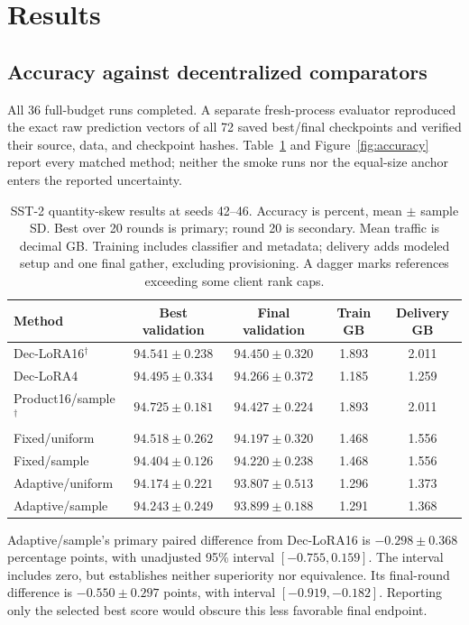 \documentclass[11pt]{article}
\begin{document}
\section{Results}
\subsection{Accuracy against decentralized comparators}
All 36 full-budget runs completed. A separate fresh-process evaluator reproduced the exact raw prediction vectors of all 72 saved best/final checkpoints and verified their source, data, and checkpoint hashes. Table~\ref{tab:results} and Figure~\ref{fig:accuracy} report every matched method; neither the smoke runs nor the equal-size anchor enters the reported uncertainty.
\begin{table}[t]
\centering\small
\caption{SST-2 quantity-skew results at seeds 42--46. Accuracy is percent, mean $\pm$ sample SD. Best over 20 rounds is primary; round 20 is secondary. Mean traffic is decimal GB. Training includes classifier and metadata; delivery adds modeled setup and one final gather, excluding provisioning. A dagger marks references exceeding some client rank caps.}
\label{tab:results}
\setlength{\tabcolsep}{4pt}
\begin{tabular}{lcccc}
\toprule
Method & Best validation & Final validation & Train GB & Delivery GB\\
\midrule
Dec-LoRA16$^\dagger$ & $94.541\pm0.238$ & $94.450\pm0.320$ & 1.893 & 2.011\\
Dec-LoRA4 & $94.495\pm0.334$ & $94.266\pm0.372$ & 1.185 & 1.259\\
Product16/sample$^\dagger$ & $94.725\pm0.181$ & $94.427\pm0.224$ & 1.893 & 2.011\\
Fixed/uniform & $94.518\pm0.262$ & $94.197\pm0.320$ & 1.468 & 1.556\\
Fixed/sample & $94.404\pm0.126$ & $94.220\pm0.238$ & 1.468 & 1.556\\
Adaptive/uniform & $94.174\pm0.221$ & $93.807\pm0.513$ & 1.296 & 1.373\\
Adaptive/sample & $94.243\pm0.249$ & $93.899\pm0.188$ & 1.291 & 1.368\\
\bottomrule
\end{tabular}
\end{table}

Adaptive/sample's primary paired difference from Dec-LoRA16 is $-0.298\pm0.368$ percentage points, with unadjusted 95\% interval $[-0.755,0.159]$. The interval includes zero, but establishes neither superiority nor equivalence. Its final-round difference is $-0.550\pm0.297$ points, with interval $[-0.919,-0.182]$. Reporting only the selected best score would obscure this less favorable final endpoint.
\end{document}

